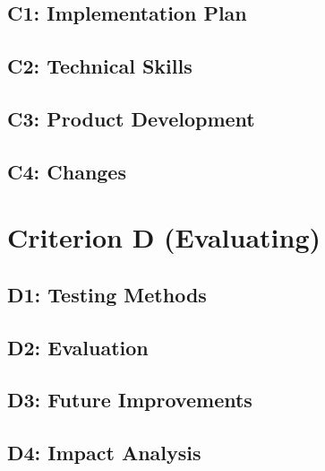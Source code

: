     \subsection*{C1: Implementation Plan}

    \pagebreak
    \subsection*{C2: Technical Skills}

    \pagebreak
    \subsection*{C3: Product Development}

    \pagebreak
    \subsection*{C4: Changes}
    
    \pagebreak
    \section*{Criterion D (Evaluating)}

    \subsection*{D1: Testing Methods}

    \pagebreak
    \subsection*{D2: Evaluation}

    \pagebreak
    \subsection*{D3: Future Improvements}

    \pagebreak
    \subsection*{D4: Impact Analysis}

